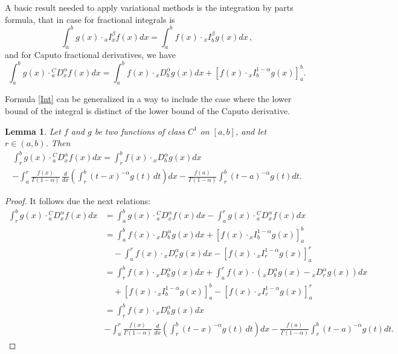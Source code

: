 \documentclass[10pt]{article}
\newtheorem{lemma}[theorem]{Lemma}
\begin{document}
A basic result needed to apply variational methods is the integration by parts formula, that in case for fractional integrals is
\begin{equation}\label{Int2}\displaystyle\int_{a}^{b}  g(x) \cdot {_aI_x^\beta}f(x)dx=\int_a^b f(x) \cdot {_x I_b^\beta} g(x)dx \, ,\end{equation}
and for Caputo fractional derivatives, we have
\begin{equation}\label{Int}\int_{a}^{b}g(x)\cdot {_a^C D_x^\alpha}f(x)dx=\int_a^b f(x)\cdot {_x D_b^\alpha} g(x)dx+\left[f(x)\cdot{_xI_b^{1-\alpha}}g(x)\right]_a^b.
\end{equation}


Formula \eqref{Int} can be generalized in a way to include the case where the lower bound of the integral is distinct of the lower bound of the Caputo derivative.

\begin{lemma}\label{LemmaInt} Let $f$ and $g$ be two functions of class $C^1$ on $[a,b]$, and let $r\in(a,b)$. Then
\begin{multline}\label{GenInt}\int_{r}^{b}g(x)\cdot {_a^C D_x^\alpha}f(x)dx=\int_r^b f(x)\cdot {_x D_b^\alpha} g(x)dx\\
-\int_a^r\frac{f(x)}{\Gamma(1-\alpha)}\, \frac{d}{dx}\left(\int_r^b (t-x)^{-\alpha}g(t)\,dt\right)dx-
\frac{f(a)}{\Gamma(1-\alpha)}\int_r^b(t-a)^{-\alpha}g(t)dt.\end{multline}
\end{lemma}
\begin{proof} It follows due the next relations:
$$\begin{array}{ll}
\displaystyle \int_{r}^{b}g(x)\cdot {_a^C D_x^\alpha}f(x)dx & =\displaystyle \int_{a}^{b}g(x)\cdot {_a^C D_x^\alpha}f(x)dx-\int_{a}^{r}g(x)\cdot {_a^C D_x^\alpha}f(x)dx\\
                    & = \displaystyle\int_{a}^{b}f(x)\cdot {_x D_b^\alpha}g(x)dx+ \left[f(x) \cdot{_xI_b^{1-\alpha}}g(x) \right]_a^b\\
                    &\quad - \displaystyle \int_{a}^{r}f(x)\cdot {_x D_r^\alpha}g(x)dx-\left[f(x)\cdot {_xI_r^{1-\alpha}}g(x) \right]_a^r\\
                     &=\displaystyle\int_{r}^{b}f(x)\cdot {_x D_b^\alpha}g(x)dx+\int_{a}^{r}f(x)\cdot \left({_x D_b^\alpha}g(x)-{_x D_r^\alpha}g(x)\right)dx\\
                     & \displaystyle\quad +\left[f(x)\cdot {_xI_b^{1-\alpha}}g(x) \right]_a^b-\left[f(x)\cdot {_xI_r^{1-\alpha}}g(x) \right]_a^r\\
                     &=\displaystyle\int_r^b f(x)\cdot {_x D_b^\alpha} g(x)dx\\
&\displaystyle-\int_a^r\frac{f(x)}{\Gamma(1-\alpha)}\, \frac{d}{dx}\left(\int_r^b (t-x)^{-\alpha}g(t)\,dt\right)dx-
\frac{f(a)}{\Gamma(1-\alpha)}\int_r^b(t-a)^{-\alpha}g(t)dt.
\end{array}$$
\end{proof}
\end{document}
